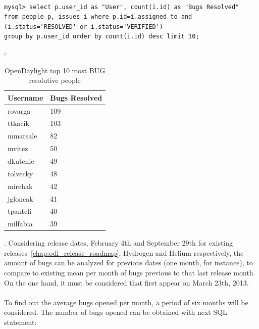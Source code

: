 \documentclass[a4paper, 12pt]{book}
\begin{document}
{\begin{verbatim}

mysql> select p.user_id as "User", count(i.id) as "Bugs Resolved"
from people p, issues i where p.id=i.assigned_to and
(i.status='RESOLVED' or i.status='VERIFIED')
group by p.user_id order by count(i.id) desc limit 10;

\end{verbatim}
:
\begin{table}[H]
\footnotesize
\begin{center}
\begin{tabular}{|p{3cm}|p{3cm}|}
\hline
\textbf{Username} & \textbf{Bugs Resolved} \\ \hline
rovarga  & 109 \\ \hline
ttkacik  & 103 \\ \hline
mmarsale & 82  \\ \hline
mvitez   & 50  \\ \hline
dkutenic & 49  \\ \hline
tolvecky & 48  \\ \hline
mirehak  & 42  \\ \hline
jgloncak & 41  \\ \hline
tpanteli & 40  \\ \hline
milfabia & 39  \\ \hline
\end{tabular}
\end{center}
\caption{OpenDaylight top 10 most BUG resolutive people}
\label{tab:odl_top_people_resolving_bugs}
\end{table}
. Considering release dates, February 4th and September 29th for existing releases~\ref{chap:odl_release_roadmap}, Hydrogen and Helium respectively, the amount of bugs can be analyzed for previous dates (one month, for instance), to compare to existing mean per month of bugs previous to that last release month. On the one hand, it must be considered that first  appear on March 23th, 2013.\\
\\
To find out the average bugs opened per month, a period of six months will be considered. The number of bugs opened can be obtained with next SQL statement:

}
\end{document}
